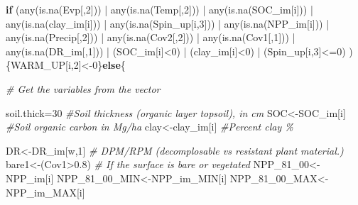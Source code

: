 \documentclass[
  10pt,
  b5paper,
]{book}
\newenvironment{Shaded}{\begin{snugshade}}{\end{snugshade}}
\newcommand{\CommentTok}[1]{\textcolor[rgb]{0.56,0.35,0.01}{\textit{#1}}}
\newcommand{\ControlFlowTok}[1]{\textcolor[rgb]{0.13,0.29,0.53}{\textbf{#1}}}
\newcommand{\DecValTok}[1]{\textcolor[rgb]{0.00,0.00,0.81}{#1}}
\newcommand{\FloatTok}[1]{\textcolor[rgb]{0.00,0.00,0.81}{#1}}
\newcommand{\FunctionTok}[1]{\textcolor[rgb]{0.00,0.00,0.00}{#1}}
\newcommand{\NormalTok}[1]{#1}
\newcommand{\OtherTok}[1]{\textcolor[rgb]{0.56,0.35,0.01}{#1}}
\newcommand{\SpecialCharTok}[1]{\textcolor[rgb]{0.00,0.00,0.00}{#1}}
\begin{document}
\begin{Shaded}
\begin{Highlighting}[]
\ControlFlowTok{if}\NormalTok{ (}\FunctionTok{any}\NormalTok{(}\FunctionTok{is.na}\NormalTok{(Evp[,}\DecValTok{2}\NormalTok{])) }\SpecialCharTok{|} \FunctionTok{any}\NormalTok{(}\FunctionTok{is.na}\NormalTok{(Temp[,}\DecValTok{2}\NormalTok{])) }\SpecialCharTok{|} \FunctionTok{any}\NormalTok{(}\FunctionTok{is.na}\NormalTok{(SOC\_im[i])) }\SpecialCharTok{|} \FunctionTok{any}\NormalTok{(}\FunctionTok{is.na}\NormalTok{(clay\_im[i])) }\SpecialCharTok{|} \FunctionTok{any}\NormalTok{(}\FunctionTok{is.na}\NormalTok{(Spin\_up[i,}\DecValTok{3}\NormalTok{]))  }\SpecialCharTok{|} \FunctionTok{any}\NormalTok{(}\FunctionTok{is.na}\NormalTok{(NPP\_im[i])) }\SpecialCharTok{|} \FunctionTok{any}\NormalTok{(}\FunctionTok{is.na}\NormalTok{(Precip[,}\DecValTok{2}\NormalTok{]))  }\SpecialCharTok{|}  \FunctionTok{any}\NormalTok{(}\FunctionTok{is.na}\NormalTok{(Cov2[,}\DecValTok{2}\NormalTok{]))  }\SpecialCharTok{|}  \FunctionTok{any}\NormalTok{(}\FunctionTok{is.na}\NormalTok{(Cov1[,}\DecValTok{1}\NormalTok{]))  }\SpecialCharTok{|} \FunctionTok{any}\NormalTok{(}\FunctionTok{is.na}\NormalTok{(DR\_im[,}\DecValTok{1}\NormalTok{]))    }\SpecialCharTok{|}\NormalTok{  (SOC\_im[i]}\SpecialCharTok{\textless{}}\DecValTok{0}\NormalTok{) }\SpecialCharTok{|}\NormalTok{ (clay\_im[i]}\SpecialCharTok{\textless{}}\DecValTok{0}\NormalTok{) }\SpecialCharTok{|}\NormalTok{ (Spin\_up[i,}\DecValTok{3}\NormalTok{]}\SpecialCharTok{\textless{}=}\DecValTok{0}\NormalTok{) ) \{WARM\_UP[i,}\DecValTok{2}\NormalTok{]}\OtherTok{\textless{}{-}}\DecValTok{0}\NormalTok{\}}\ControlFlowTok{else}\NormalTok{\{}

\CommentTok{\# Get the variables from the vector}

\NormalTok{soil.thick}\OtherTok{=}\DecValTok{30}  \CommentTok{\#Soil thickness (organic layer topsoil), in cm}
\NormalTok{SOC}\OtherTok{\textless{}{-}}\NormalTok{SOC\_im[i]      }\CommentTok{\#Soil organic carbon in Mg/ha }
\NormalTok{clay}\OtherTok{\textless{}{-}}\NormalTok{clay\_im[i]        }\CommentTok{\#Percent clay \%}

\NormalTok{DR}\OtherTok{\textless{}{-}}\NormalTok{DR\_im[w,}\DecValTok{1}\NormalTok{]              }\CommentTok{\# DPM/RPM (decomplosable vs resistant plant material.)}
\NormalTok{bare1}\OtherTok{\textless{}{-}}\NormalTok{(Cov1}\SpecialCharTok{\textgreater{}}\FloatTok{0.8}\NormalTok{)           }\CommentTok{\# If the surface is bare or vegetated}
\NormalTok{NPP\_81\_00}\OtherTok{\textless{}{-}}\NormalTok{NPP\_im[i]}
\NormalTok{NPP\_81\_00\_MIN}\OtherTok{\textless{}{-}}\NormalTok{NPP\_im\_MIN[i]}
\NormalTok{NPP\_81\_00\_MAX}\OtherTok{\textless{}{-}}\NormalTok{NPP\_im\_MAX[i]}


\end{Highlighting}
\end{Shaded}
\end{document}
